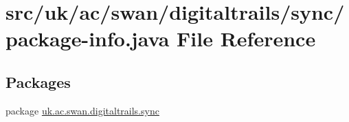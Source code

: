 \hypertarget{sync_2package-info_8java}{\section{src/uk/ac/swan/digitaltrails/sync/package-\/info.java File Reference}
\label{sync_2package-info_8java}
}
\subsection*{Packages}
\begin{DoxyCompactItemize}
\item 
package \hyperlink{namespaceuk_1_1ac_1_1swan_1_1digitaltrails_1_1sync}{uk.\+ac.\+swan.\+digitaltrails.\+sync}
\end{DoxyCompactItemize}
